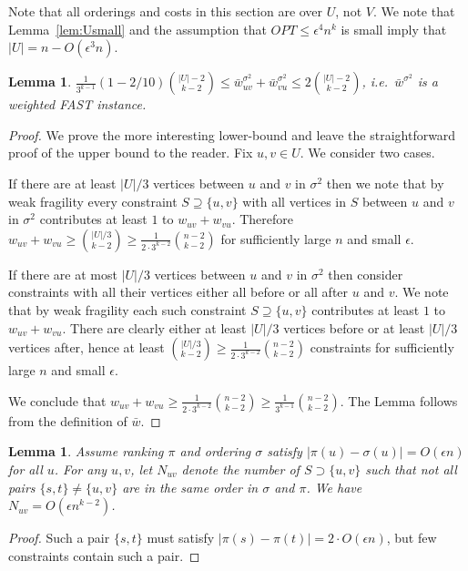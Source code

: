 \documentclass[dvips,11pt,letter]{article}
\newcommand{\set}[1]{\{#1\}}                        \newcommand{\setof}[2]{\{\,{#1}\::\:{#2}\,\}}        \newcommand{\groupFrac}[2]{\left(\frac{#1}{#2}\right)}
\newtheorem{lemma}[theorem]{Lemma}
\begin{document}
Note that all orderings and costs in this section are over $U$, not $V$. We note that  Lemma~\ref{lem:Usmall} and the assumption that $OPT\le \epsilon^4 n^k$ is small imply that $|U|=n - O(\epsilon^3 n)$.

\begin{lemma}\label{lem:wBarFAST}
$\frac{1}{3^{k-1}}(1 - 2/10) \binom{|U|-2}{k-2} \le \bar w_{uv}^{\sigma^2} + \bar w_{vu}^{\sigma^2} \le 2 \binom{|U|-2}{k-2}$, i.e.\ $\bar w^{\sigma^2}$ is a weighted FAST instance.
\end{lemma}
\begin{proof}
We prove the more interesting lower-bound and leave the straightforward proof of the upper bound to the reader. Fix $u,v \in U$. We consider two cases.

If there are at least $|U|/3$ vertices between $u$ and $v$ in $\sigma^2$ then we note that by weak fragility every constraint $S \supseteq \set{u,v}$ with all vertices in $S$ between $u$ and $v$ in $\sigma^2$ contributes at least $1$ to $w_{uv}+w_{vu}$. Therefore $w_{uv}+w_{vu} \ge \binom{|U|/3}{k-2} \ge \frac{1}{2 \cdot 3^{k-2}}\binom{n-2}{k-2}$ for sufficiently large $n$ and small $\epsilon$.

If there are at most $|U|/3$ vertices between $u$ and $v$ in $\sigma^2$ then consider constraints with all their vertices either all before or all after $u$ and $v$. We note that by weak fragility each such constraint $S \supseteq \set{u,v}$ contributes at least $1$ to $w_{uv}+w_{vu}$. There are clearly either at least $|U|/3$ vertices  before or at least $|U|/3$ vertices after, hence at least $\binom{|U|/3}{k-2} \ge \frac{1}{2 \cdot 3^{k-2}} \binom{n-2}{k-2}$ constraints for sufficiently large $n$ and small $\epsilon$.

We conclude that $w_{uv} + w_{vu} \ge \frac{1}{2 \cdot 3^{k-2}}\binom{n-2}{k-2} \ge \frac{1}{3^{k-1}}\binom{n-2}{k-2}$. The Lemma follows from the definition of $\bar w$.
\end{proof}

\begin{lemma}\label{lem:footInv}
Assume ranking $\pi$ and ordering $\sigma$ satisfy $|\pi(u) - \sigma(u)| =O( \epsilon n)$ for all $u$. 
For any $u,v$, let $N_{uv}$ denote the number of $S \supset \set{u,v}$ such that not all pairs $\set{s,t} \ne \set{u,v}$ are in the same order in $\sigma$ and $\pi$. We have $N_{uv} =O( \epsilon n^{k-2})$.
\end{lemma}
\begin{proof}
Such a pair $\set{s,t}$ must satisfy $|\pi(s) - \pi(t)| =2\cdot O(\epsilon n)$, but few constraints contain such a pair.
\end{proof}
\end{document}
